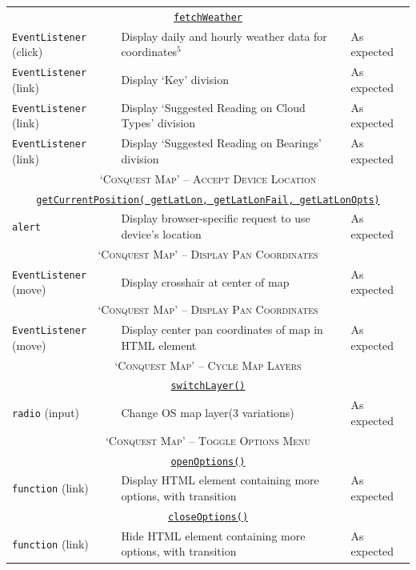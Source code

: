 \documentclass[11pt, english]{article}
\begin{document}
\begin{center}
\begin{longtable}{p{3cm}p{8cm}p{2cm}}
		\multicolumn{3}{c}{\underline{\texttt{fetchWeather}}}\\
		\texttt{EventListener} (click) & Display daily and hourly weather data for coordinates$^{5}$ & As expected\\
		\texttt{EventListener} (link) & Display `Key' division & As expected\\
		\texttt{EventListener} (link) & Display `Suggested Reading on Cloud Types' division & As expected\\
		\texttt{EventListener} (link) & Display `Suggested Reading on Bearings' division & As expected\\
		\hline
		\multicolumn{3}{c}{\textsc{`Conquest Map' -- Accept Device Location}}\\
		\hline
		\multicolumn{3}{c}{\underline{\texttt{getCurrentPosition( getLatLon, getLatLonFail, getLatLonOpts)}}}\\
		\texttt{alert} & Display browser-specific request to use device's location & As expected\\
		\hline
		\multicolumn{3}{c}{\textsc{`Conquest Map' -- Display Pan Coordinates}}\\
		\hline
		\texttt{EventListener} (move) & Display crosshair at center of map & As expected\\
		\hline
		\multicolumn{3}{c}{\textsc{`Conquest Map' -- Display Pan Coordinates}}\\
		\hline
		\texttt{EventListener} (move) & Display center pan coordinates of map in HTML element & As expected\\
		\hline
		\multicolumn{3}{c}{\textsc{`Conquest Map' -- Cycle Map Layers}}\\
		\hline
		\multicolumn{3}{c}{\underline{\texttt{switchLayer()}}}\\
		\texttt{radio} (input) & Change OS map layer\newline (3 variations) & As expected\\
		\hline
		\multicolumn{3}{c}{\textsc{`Conquest Map' -- Toggle Options Menu}}\\
		\hline
		\multicolumn{3}{c}{\underline{\texttt{openOptions()}}}\\
		\texttt{function} (link) & Display HTML element containing more options, with transition & As expected\\
		\multicolumn{3}{c}{\underline{\texttt{closeOptions()}}}\\
		\texttt{function} (link) & Hide HTML element containing more options, with transition & As expected\\
		\hline

\end{longtable}
\end{center}
\end{document}
